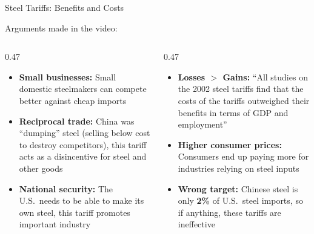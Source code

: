 \documentclass[9pt,english,aspectratio=169]{beamer}
\begin{document}
\begin{frame}{Steel Tariffs: Benefits and Costs}

  Arguments made in the video:

  \vspace{0.5em}
  \begin{columns}[T]
    \begin{column}{0.47\textwidth}

      \vspace{0.5em}
      \begin{itemize}\small
        \item \textbf{Small businesses:} Small domestic steelmakers can compete better against cheap imports
        \item \textbf{Reciprocal trade:} China was ``dumping'' steel (selling below cost to destroy competitors), this tariff acts as a disincentive for steel and other goods
        \item \textbf{National security:} The U.S.\ needs to be able to make its own steel, this tariff promotes important industry
      \end{itemize}
    \end{column} \pause
    \begin{column}{0.47\textwidth}

      \vspace{0.5em}
      \begin{itemize}\small
        \item \textbf{Losses $>$ Gains:} ``All studies on the 2002 steel tariffs find that the costs of the tariffs outweighed their benefits in terms of GDP and employment''
        \item \textbf{Higher consumer prices:} Consumers end up paying more for industries relying on steel inputs
        \item \textbf{Wrong target:} Chinese steel is only \textbf{2\%} of U.S.\ steel imports, so if anything, these tariffs are ineffective 
      \end{itemize}
    \end{column}
  \end{columns}

\end{frame}
\end{document}

